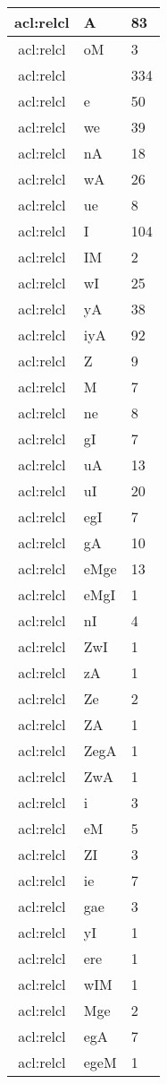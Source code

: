 \documentclass[a4 paper]{article}
\begin{document}
\begin{longtable}{cp{}p{}}
acl:relcl & A & 83\\ \midrule acl:relcl & oM & 3\\ \midrule acl:relcl &  & 334\\ \midrule acl:relcl & e & 50\\ \midrule acl:relcl & we & 39\\ \midrule acl:relcl & nA & 18\\ \midrule acl:relcl & wA & 26\\ \midrule acl:relcl & ue & 8\\ \midrule acl:relcl & I & 104\\ \midrule acl:relcl & IM & 2\\ \midrule acl:relcl & wI & 25\\ \midrule acl:relcl & yA & 38\\ \midrule acl:relcl & iyA & 92\\ \midrule acl:relcl & Z & 9\\ \midrule acl:relcl & M & 7\\ \midrule acl:relcl & ne & 8\\ \midrule acl:relcl & gI & 7\\ \midrule acl:relcl & uA & 13\\ \midrule acl:relcl & uI & 20\\ \midrule acl:relcl & egI & 7\\ \midrule acl:relcl & gA & 10\\ \midrule acl:relcl & eMge & 13\\ \midrule acl:relcl & eMgI & 1\\ \midrule acl:relcl & nI & 4\\ \midrule acl:relcl & ZwI & 1\\ \midrule acl:relcl & zA & 1\\ \midrule acl:relcl & Ze & 2\\ \midrule acl:relcl & ZA & 1\\ \midrule acl:relcl & ZegA & 1\\ \midrule acl:relcl & ZwA & 1\\ \midrule acl:relcl & i & 3\\ \midrule acl:relcl & eM & 5\\ \midrule acl:relcl & ZI & 3\\ \midrule acl:relcl & ie & 7\\ \midrule acl:relcl & gae & 3\\ \midrule acl:relcl & yI & 1\\ \midrule acl:relcl & ere & 1\\ \midrule acl:relcl & wIM & 1\\ \midrule acl:relcl & Mge & 2\\ \midrule acl:relcl & egA & 7\\ \midrule acl:relcl & egeM & 1\\ \midrule 

\end{longtable}
\end{document}
